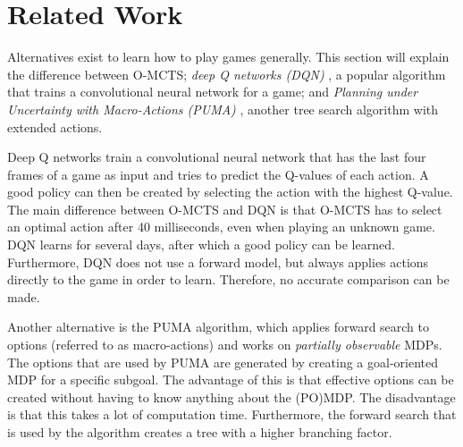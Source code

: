 \section{Related Work}
\label{sec:related}
Alternatives exist to learn how to play games generally. This section will
explain the difference between O-MCTS; \emph{deep Q networks (DQN)}
\cite{mnih2013playing}, a popular algorithm that trains a convolutional neural
network for a game; and \emph{Planning under Uncertainty with Macro-Actions
(PUMA)} \cite{he2010puma}, another tree search algorithm with extended actions.

Deep Q networks train a convolutional neural network that has the
last four frames of a game as input and tries to predict the Q-values of each
action. A good policy can then be created by selecting the action with the
highest Q-value. The main difference between O-MCTS and DQN is that O-MCTS has
to select an optimal action after 40 milliseconds, even when playing an unknown
game. DQN learns for several days, after which a good policy can be learned.
Furthermore, DQN does not use a forward model, but always applies actions
directly to the game in order to learn. 
Therefore, no accurate comparison can be made.

Another alternative is the PUMA algorithm, which applies forward search to
options (referred to as macro-actions) and works on \emph{partially observable}
MDPs. The options that are used by PUMA are generated by creating a goal-oriented
MDP for a specific subgoal. The advantage of this is that effective options can
be created without having to know anything about the (PO)MDP. The disadvantage
is that this takes a lot of computation time. Furthermore, the forward search
that is used by the algorithm creates a tree with a higher branching factor.
